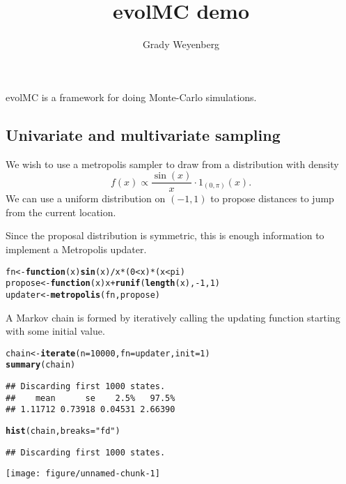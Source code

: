 \documentclass{article}\usepackage[]{graphicx}\usepackage[]{color}
\title{evolMC demo}
\author{Grady Weyenberg}
\makeatletter
\def\maxwidth{ %
  \ifdim\Gin@nat@width>\linewidth
    \linewidth
  \else
    \Gin@nat@width
  \fi
}
\newcommand{\hlnum}[1]{\textcolor[rgb]{0.686,0.059,0.569}{#1}}%
\newcommand{\hlstr}[1]{\textcolor[rgb]{0.192,0.494,0.8}{#1}}%
\newcommand{\hlopt}[1]{\textcolor[rgb]{0,0,0}{#1}}%
\newcommand{\hlstd}[1]{\textcolor[rgb]{0.345,0.345,0.345}{#1}}%
\newcommand{\hlkwa}[1]{\textcolor[rgb]{0.161,0.373,0.58}{\textbf{#1}}}%
\newcommand{\hlkwb}[1]{\textcolor[rgb]{0.69,0.353,0.396}{#1}}%
\newcommand{\hlkwc}[1]{\textcolor[rgb]{0.333,0.667,0.333}{#1}}%
\newcommand{\hlkwd}[1]{\textcolor[rgb]{0.737,0.353,0.396}{\textbf{#1}}}%
\newenvironment{kframe}{%
 \def\at@end@of@kframe{}%
 \ifinner\ifhmode%
  \def\at@end@of@kframe{\end{minipage}}%
  \begin{minipage}{\columnwidth}%
 \fi\fi%
 \def\FrameCommand##1{\hskip\@totalleftmargin \hskip-\fboxsep
 \colorbox{shadecolor}{##1}\hskip-\fboxsep
     \hskip-\linewidth \hskip-\@totalleftmargin \hskip\columnwidth}%
 \MakeFramed {\advance\hsize-\width
   \@totalleftmargin\z@ \linewidth\hsize
   \@setminipage}}%
 {\par\unskip\endMakeFramed%
 \at@end@of@kframe}
\newenvironment{knitrout}{}{} %
\makeatother
\begin{document}
\maketitle

evolMC is a framework for doing Monte-Carlo simulations.

\subsection{Univariate and multivariate sampling}
We wish to use a metropolis sampler to draw from a distribution with
density \[ f(x) \propto \frac{\sin(x)}{x} \cdot 1_{(0,\pi)}(x). \] We
can use a uniform distribution on $(-1,1)$ to propose distances to
jump from the current location.


Since the proposal distribution is symmetric, this is enough
information to implement a Metropolis updater.

\begin{knitrout}
\color{fgcolor}\begin{kframe}
\begin{alltt}
\hlstd{fn} \hlkwb{<-} \hlkwa{function}\hlstd{(}\hlkwc{x}\hlstd{)} \hlkwd{sin}\hlstd{(x)}\hlopt{/}\hlstd{x} \hlopt{*} \hlstd{(}\hlnum{0} \hlopt{<} \hlstd{x)} \hlopt{*} \hlstd{(x} \hlopt{<} \hlstd{pi)}
\hlstd{propose} \hlkwb{<-} \hlkwa{function}\hlstd{(}\hlkwc{x}\hlstd{) x} \hlopt{+} \hlkwd{runif}\hlstd{(}\hlkwd{length}\hlstd{(x),} \hlopt{-}\hlnum{1}\hlstd{,} \hlnum{1}\hlstd{)}
\hlstd{updater} \hlkwb{<-} \hlkwd{metropolis}\hlstd{(fn, propose)}
\end{alltt}
\end{kframe}
\end{knitrout}


A Markov chain is formed by iteratively calling the updating function
starting with some initial value.
\begin{knitrout}
\color{fgcolor}\begin{kframe}
\begin{alltt}
\hlstd{chain} \hlkwb{<-} \hlkwd{iterate}\hlstd{(}\hlkwc{n} \hlstd{=} \hlnum{10000}\hlstd{,} \hlkwc{fn} \hlstd{= updater,} \hlkwc{init} \hlstd{=} \hlnum{1}\hlstd{)}
\hlkwd{summary}\hlstd{(chain)}
\end{alltt}
\begin{verbatim}
## Discarding first 1000 states.
##    mean      se    2.5%   97.5% 
## 1.11712 0.73918 0.04531 2.66390
\end{verbatim}
\begin{alltt}
\hlkwd{hist}\hlstd{(chain,} \hlkwc{breaks} \hlstd{=} \hlstr{"fd"}\hlstd{)}
\end{alltt}
\begin{verbatim}
## Discarding first 1000 states.
\end{verbatim}
\end{kframe}
\texttt{[image: figure/unnamed-chunk-1]} 

\end{knitrout}
\end{document}
